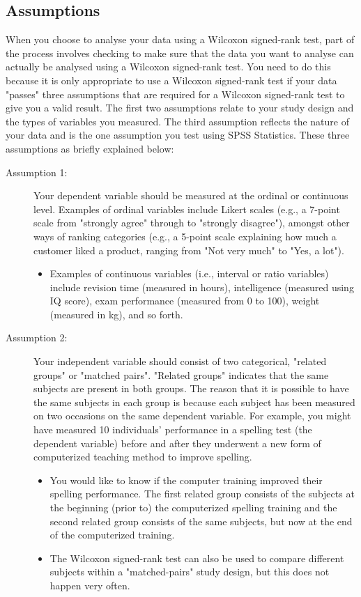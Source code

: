 \documentclass[]{article}
\begin{document}
\subsection{Assumptions}
When you choose to analyse your data using a Wilcoxon signed-rank test, part of the process involves checking to make sure that the data you want to analyse can actually be analysed using a Wilcoxon signed-rank test. You need to do this because it is only appropriate to use a Wilcoxon signed-rank test if your data "passes" three assumptions that are required for a Wilcoxon signed-rank test to give you a valid result. The first two assumptions relate to your study design and the types of variables you measured. The third assumption reflects the nature of your data and is the one assumption you test using SPSS Statistics. These three assumptions as briefly explained below:
\begin{description}
\item[Assumption 1:] Your dependent variable should be measured at the ordinal or continuous level. Examples of ordinal variables include Likert scales (e.g., a 7-point scale from "strongly agree" through to "strongly disagree"), amongst other ways of ranking categories (e.g., a 5-point scale explaining how much a customer liked a product, ranging from "Not very much" to "Yes, a lot"). 
\begin{itemize}
\item Examples of continuous variables (i.e., interval or ratio variables) include revision time (measured in hours), intelligence (measured using IQ score), exam performance (measured from 0 to 100), weight (measured in kg), and so forth. 
\end{itemize}
\item[Assumption 2:] Your independent variable should consist of two categorical, "related groups" or "matched pairs". "Related groups" indicates that the same subjects are present in both groups. The reason that it is possible to have the same subjects in each group is because each subject has been measured on two occasions on the same dependent variable. For example, you might have measured 10 individuals' performance in a spelling test (the dependent variable) before and after they underwent a new form of computerized teaching method to improve spelling. 
\begin{itemize}
	\item You would like to know if the computer training improved their spelling performance. The first related group consists of the subjects at the beginning (prior to) the computerized spelling training and the second related group consists of the same subjects, but now at the end of the computerized training. 
	\item The Wilcoxon signed-rank test can also be used to compare different subjects within a "matched-pairs" study design, but this does not happen very often. 
\end{itemize}



\end{description}
\end{document}
